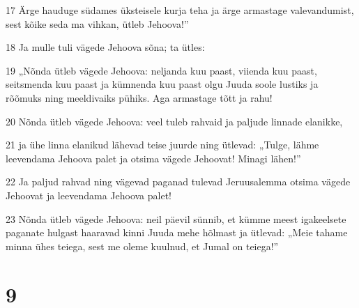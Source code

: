 \par 17 Ärge hauduge südames üksteisele kurja teha ja ärge armastage valevandumist, sest kõike seda ma vihkan, ütleb Jehoova!”
\par 18 Ja mulle tuli vägede Jehoova sõna; ta ütles:
\par 19 „Nõnda ütleb vägede Jehoova: neljanda kuu paast, viienda kuu paast, seitsmenda kuu paast ja kümnenda kuu paast olgu Juuda soole lustiks ja rõõmuks ning meeldivaiks pühiks. Aga armastage tõtt ja rahu!
\par 20 Nõnda ütleb vägede Jehoova: veel tuleb rahvaid ja paljude linnade elanikke,
\par 21 ja ühe linna elanikud lähevad teise juurde ning ütlevad: „Tulge, lähme leevendama Jehoova palet ja otsima vägede Jehoovat! Minagi lähen!”
\par 22 Ja paljud rahvad ning vägevad paganad tulevad Jeruusalemma otsima vägede Jehoovat ja leevendama Jehoova palet!
\par 23 Nõnda ütleb vägede Jehoova: neil päevil sünnib, et kümme meest igakeelsete paganate hulgast haaravad kinni Juuda mehe hõlmast ja ütlevad: „Meie tahame minna ühes teiega, sest me oleme kuulnud, et Jumal on teiega!”


\chapter{9}

